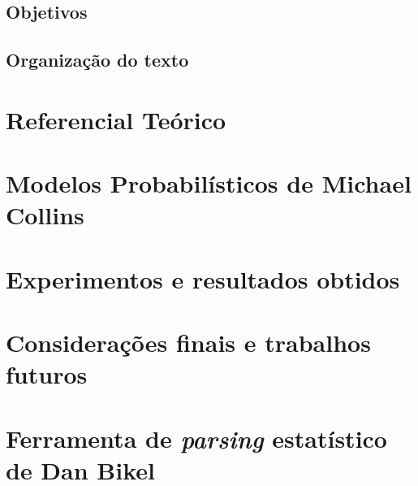 \documentclass[a4paper]{abnt}
\begin{document}
\section{Objetivos}
\label{sec:objetivos}
	

\newpage

\section{Organização do texto}
\label{sec:organizacao}
	

\chapter{Referencial Teórico}
\label{cha:referencial_teorico}
	

\chapter{Modelos Probabilísticos de Michael Collins}
\label{cha:michael_collins}
	

\chapter{Experimentos e resultados obtidos}
\label{cha:resultados_obtidos}
	

\chapter{Considerações finais e trabalhos futuros}
\label{cha:consideracoes_finais}
	

%	

\appendix

\chapter{Ferramenta de \emph{parsing} estatístico de Dan Bikel}
\label{cha:dan_bikel1}
	
\end{document}
